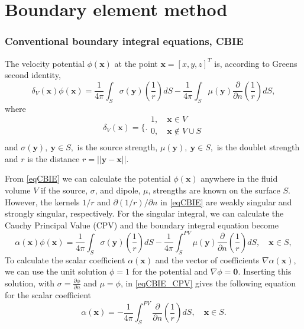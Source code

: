 \documentclass[]{book}
\newcommand{\V}[1]{\boldsymbol{#1}}
\newcommand{\D}[2]{\frac{\partial #1}{\partial #2}}
\begin{document}
\chapter{Boundary element method}

\subsection{Conventional boundary integral equations, CBIE}

The velocity potential $\phi(\V{x})$ at the point $\V{x} = \left[x,y,z\right]^T$ is, according to Greens second identity, 
\begin{equation}
	\delta_{V}(\V{x})\phi(\V{x}) = 
	 \frac{1}{4 \pi} \int_{S} \sigma (\V{y}) \left(\frac{1}{r} \right) dS
	- \frac{1}{4 \pi} \int_{S} \mu(\V{y})  \frac{\partial }{\partial n} \left( \frac{1}{r}\right) dS,
\label{eqCBIE}
\end{equation}
where
\begin{equation}
\delta_{V}(\V{x}) =\biggl\{ \bigl.
\begin{array}{ll}
1,\quad \V{x} \in V \\
0,\quad \V{x} \not\in V \cup S \\
\end{array}
\end{equation}
and $\sigma(\V{y}),~ \V{y} \in S,$ is the source strength, $\mu(\V{y}),~ \V{y} \in S,$ is the doublet strength and $r$ is the distance $r = ||\V{y}-\V{x}||$.

From \ref{eqCBIE} we can calculate the potential $\phi(\V{x})$ anywhere in the fluid volume $V$ if the source, $\sigma$, and dipole, $\mu$, strengths are known on the surface $S$. However, the kernels $1/r$ and $ \partial (1/r)/\partial n$ in \ref{eqCBIE} are weakly singular and strongly singular, respectively. For the singular integral, we can calculate the Cauchy Principal Value (CPV) and the  boundary integral equation become
\begin{equation}
\alpha (\V{x}) \phi(\V{x}) = 
\frac{1}{4 \pi} \int_{S} \sigma (\V{y}) \left(\frac{1}{r} \right) dS
- \frac{1}{4 \pi} \int_{S}^{PV} \mu(\V{y})  \frac{\partial }{\partial n} \left( \frac{1}{r}\right) dS, \quad \V{x} \in S,
\label{eqCBIE_CPV}
\end{equation}
To calculate the scalar coefficient $\alpha(\V{x})$ and the vector of coefficients $\nabla \alpha(\V{x})$, we can use the unit solution $\phi = 1$ for the potential and $\nabla \phi = \V{0}$. Inserting this solution, with $\sigma = \D{\phi}{n}$ and $\mu = \phi$, in \eqref{eqCBIE_CPV} gives the following equation for the scalar coefficient
\begin{equation}
\alpha (\V{x}) = - \frac{1}{4 \pi} \int_{S}^{PV} \frac{\partial }{\partial n} \left( \frac{1}{r}\right) dS, \quad \V{x} \in S.
\label{eqCBIE_CPV}
\end{equation}
\end{document}

